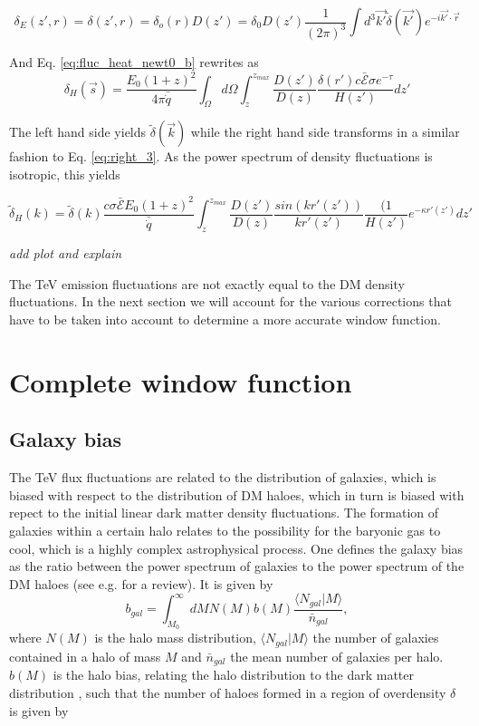 \documentclass[twocolumns]{emulateapj}
\begin{document}
\begin{equation}
  \label{eq:FT_delta}
  \delta_E(z',r)=\delta(z',r)=\delta_o(r)D(z')=\delta_0D(z')\frac{1}{(2\pi)^3}\int d^3\vec{k'} \tilde{\delta}(\vec{k'}) e^{-i\vec{k'}\cdot\vec{r}}
\end{equation}


And Eq. \ref{eq:fluc_heat_newt0_b}  rewrites as
\begin{equation}
  \label{eq:heat_fluc_exp0}
  \delta_H(\vec{s})=\frac{E_0(1+z)^2}{4\pi\bar{\dot{q}}} \int_{\Omega}d\Omega\int_z^{z_{max}}  \frac{D(z')}{D(z)} \frac{\delta(r')c \bar{\mathcal{E}} \sigma  e^{-\tau}}{H(z')}dz'
\end{equation}


The left hand side yields $\tilde{\delta}(\vec{k})$ while the right hand side transforms in a similar fashion to Eq. \ref{eq:right_3}. As the power spectrum of density fluctuations is isotropic, this  yields

\begin{equation}
  \label{eq:heat_fluc_exp1}
  \tilde{\delta}_H(k)=\tilde{\delta}(k) \frac{c \sigma \bar{\mathcal{E}}E_0(1+z)^2}{\bar{\dot{q}}} \int_z^{z_{max}} \frac{D(z')}{D(z)}\frac{sin(kr'(z'))}{kr'(z')}    \frac{(1}{H(z')}e^{-\kappa r'(z')}   dz'
\end{equation}

\textit{add plot and explain}

The TeV emission fluctuations are not exactly equal to the DM density fluctuations. In the next section we will account for the various corrections that have to be taken into account to determine a more accurate window function.


\section{Complete window function}

%
\subsection{Galaxy bias}
The TeV flux fluctuations are related to the distribution of galaxies, which is biased with respect to the distribution of DM haloes, which in turn is biased with repect to the initial linear dark matter density fluctuations.  
The formation of galaxies within a certain halo relates to the possibility for the baryonic gas to cool, which is a highly complex astrophysical process. One defines the galaxy bias as the ratio between the power spectrum of galaxies to the power spectrum of the DM haloes (see e.g. \citep{2002PhR...372....1C} for a review).  It is given by
\begin{equation}
  \label{eq:gal_bias}
  b_{gal}=\int_{M_0}^{\infty} dM N(M) b(M) \frac{\langle N_{gal}|M\rangle }{\bar{n}_{gal}},
\end{equation}
where $N(M)$ is the halo mass distribution,  $\langle N_{gal}| M\rangle$ the number of galaxies contained in a halo of mass $M$ and $\bar{n}_{gal}$ the mean number of galaxies per halo. $b(M)$ is the halo bias, relating the halo distribution to the dark matter distribution \citep{1996MNRAS.282..347M}, such that the number of haloes formed in a region of overdensity $\delta$ is given by
\end{document}
